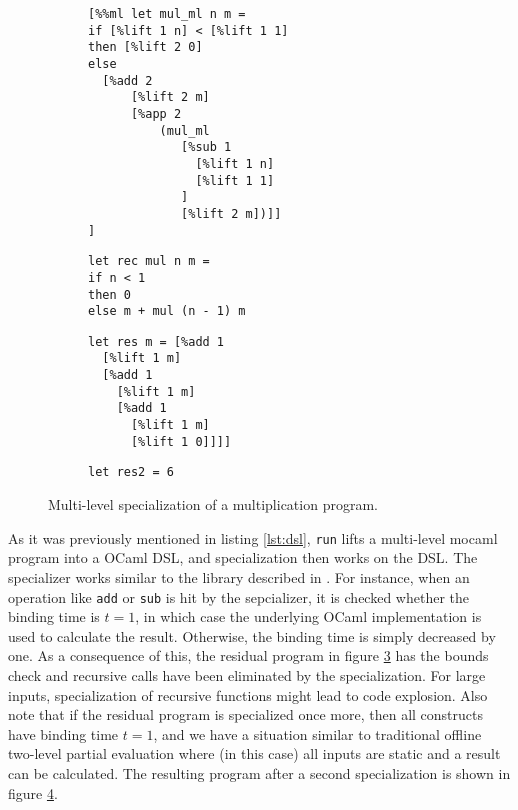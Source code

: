 \begin{figure}[H]
  \centering
  \begin{subfigure}[t]{0.49\textwidth}
\begin{verbatim}
[%%ml let mul_ml n m =
if [%lift 1 n] < [%lift 1 1]
then [%lift 2 0]
else
  [%add 2
      [%lift 2 m]
      [%app 2
          (mul_ml
             [%sub 1
               [%lift 1 n]
               [%lift 1 1]
             ]
             [%lift 2 m])]]
]
\end{verbatim}
    \label{fig:ml_mul}
  \end{subfigure}
  \begin{subfigure}[t]{0.49\textwidth}
\begin{verbatim}
let rec mul n m =
if n < 1
then 0
else m + mul (n - 1) m
\end{verbatim}
    \label{fig:mul}
  \end{subfigure}
  \begin{subfigure}[c]{0.49\textwidth}   
\begin{verbatim}
let res m = [%add 1
  [%lift 1 m]
  [%add 1
    [%lift 1 m]
    [%add 1
      [%lift 1 m]
      [%lift 1 0]]]]
\end{verbatim}
    \label{fig:mul_res}
  \end{subfigure}
  \begin{subfigure}{0.49\textwidth}
\begin{verbatim}
let res2 = 6
\end{verbatim}
    \label{fig:mul_final_res}
  \end{subfigure}
  \caption{Multi-level specialization of a multiplication program.}
  \label{lst:mul}
\end{figure}
As it was previously mentioned in listing \ref{lst:dsl}, \texttt{run} lifts a multi-level mocaml program into a OCaml DSL, and specialization then works on the DSL. The specializer works similar to the library described in \cite{multilevel}. For instance, when an operation like \texttt{add} or \texttt{sub} is hit by the sepcializer, it is checked whether the binding time is $t=1$, in which case the underlying OCaml implementation is used to calculate the result. Otherwise, the binding time is simply decreased by one. As a consequence of this, the residual program in figure \ref{fig:mul_res} has the bounds check and recursive calls have been eliminated by the specialization. For large inputs, specialization of recursive functions might lead to code explosion. Also note that if the residual program is specialized once more, then all constructs have binding time $t=1$, and we have a situation similar to traditional offline two-level partial evaluation where (in this case) all inputs are static and a result can be calculated. The resulting program after a second specialization is shown in figure \ref{fig:mul_final_res}.


